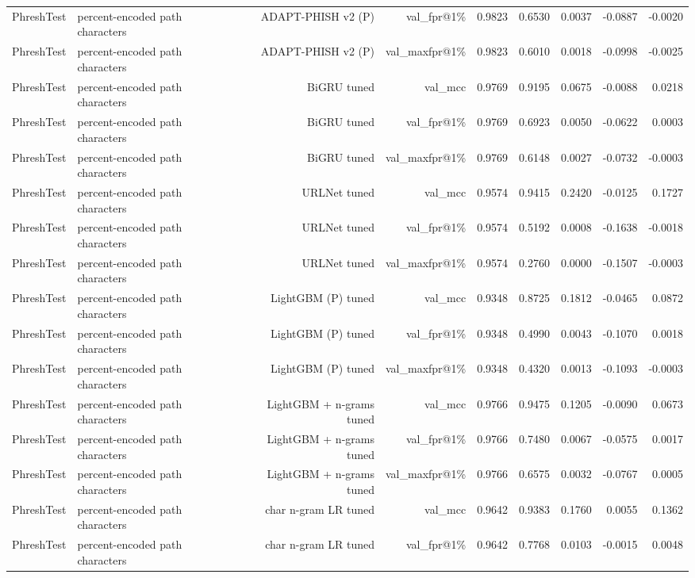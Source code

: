 \begin{table}[t]
\begin{tabular}{llrrrrrrr}
PhreshTest & percent-encoded path characters & ADAPT-PHISH v2 (P) & val\_fpr@1\% & 0.9823 & 0.6530 & 0.0037 & -0.0887 & -0.0020 \\
PhreshTest & percent-encoded path characters & ADAPT-PHISH v2 (P) & val\_maxfpr@1\% & 0.9823 & 0.6010 & 0.0018 & -0.0998 & -0.0025 \\
PhreshTest & percent-encoded path characters & BiGRU tuned & val\_mcc & 0.9769 & 0.9195 & 0.0675 & -0.0088 & 0.0218 \\
PhreshTest & percent-encoded path characters & BiGRU tuned & val\_fpr@1\% & 0.9769 & 0.6923 & 0.0050 & -0.0622 & 0.0003 \\
PhreshTest & percent-encoded path characters & BiGRU tuned & val\_maxfpr@1\% & 0.9769 & 0.6148 & 0.0027 & -0.0732 & -0.0003 \\
PhreshTest & percent-encoded path characters & URLNet tuned & val\_mcc & 0.9574 & 0.9415 & 0.2420 & -0.0125 & 0.1727 \\
PhreshTest & percent-encoded path characters & URLNet tuned & val\_fpr@1\% & 0.9574 & 0.5192 & 0.0008 & -0.1638 & -0.0018 \\
PhreshTest & percent-encoded path characters & URLNet tuned & val\_maxfpr@1\% & 0.9574 & 0.2760 & 0.0000 & -0.1507 & -0.0003 \\
PhreshTest & percent-encoded path characters & LightGBM (P) tuned & val\_mcc & 0.9348 & 0.8725 & 0.1812 & -0.0465 & 0.0872 \\
PhreshTest & percent-encoded path characters & LightGBM (P) tuned & val\_fpr@1\% & 0.9348 & 0.4990 & 0.0043 & -0.1070 & 0.0018 \\
PhreshTest & percent-encoded path characters & LightGBM (P) tuned & val\_maxfpr@1\% & 0.9348 & 0.4320 & 0.0013 & -0.1093 & -0.0003 \\
PhreshTest & percent-encoded path characters & LightGBM + n-grams tuned & val\_mcc & 0.9766 & 0.9475 & 0.1205 & -0.0090 & 0.0673 \\
PhreshTest & percent-encoded path characters & LightGBM + n-grams tuned & val\_fpr@1\% & 0.9766 & 0.7480 & 0.0067 & -0.0575 & 0.0017 \\
PhreshTest & percent-encoded path characters & LightGBM + n-grams tuned & val\_maxfpr@1\% & 0.9766 & 0.6575 & 0.0032 & -0.0767 & 0.0005 \\
PhreshTest & percent-encoded path characters & char n-gram LR tuned & val\_mcc & 0.9642 & 0.9383 & 0.1760 & 0.0055 & 0.1362 \\
PhreshTest & percent-encoded path characters & char n-gram LR tuned & val\_fpr@1\% & 0.9642 & 0.7768 & 0.0103 & -0.0015 & 0.0048 \\

\end{tabular}
\end{table}

